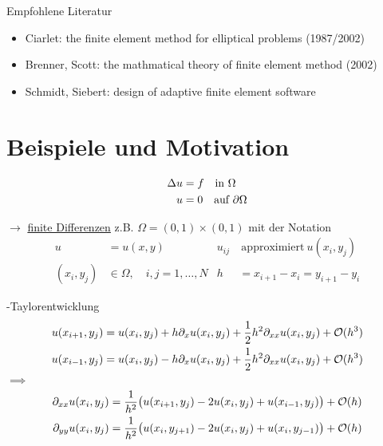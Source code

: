 
Empfohlene Literatur
\begin{itemize}
	\item Ciarlet: the finite element method for elliptical problems (1987/2002)\\
	\item Brenner, Scott: the mathmatical theory of finite element method (2002)\\
	\item Schmidt, Siebert: design of adaptive finite element software
\end{itemize}



\section{Beispiele und Motivation}

\begin{align*}
	\Delta u &= f \quad  \text{in }  \Omega\\
		  	 u &= 0 \quad \text{auf } \partial\Omega
\end{align*}

$\rightarrow$ \underline{finite Differenzen}\enter
\enter
z.B. $\Omega = (0,1) \times (0,1)$ mit der Notation
\begin{align*}
	 u&= u(x,y)				 &   u_{ij}&\ \text{approximiert}\ u(x_i,y_j)\\
	(x_i, y_j) &\in \Omega, \quad i,j = 1,\dots,N&  h&= x_{i+1} - x_i = y_{i+1}-y_i
\end{align*}

-Taylorentwicklung
\begin{align*}
	u(x_{i+1},y_j) &= 	u(x_{i},y_j) + 	h\partial_x u(x_{i},y_j) + \frac{1}{2}h^2 \partial_{xx}	u(x_i,y_j) + \mathcal{O}(h^3)\\
	u(x_{i-1},y_j) &= 	u(x_{i},y_j) - 	h\partial_x u(x_{i},y_j) + \frac{1}{2}h^2 \partial_{xx}	u(x_i,y_j) + \mathcal{O}(h^3)\\
\end{align*}
$\implies$
\begin{align*}
	\partial_{xx} u(x_i,y_j) &= \frac{1}{h^2}\big(	u(x_{i+1},y_j) - 2u(x_i,y_j) + 	u(x_{i-1},y_j) \big) + \mathcal{O}(h)\\
	\partial_{yy} u(x_i,y_j) &= \frac{1}{h^2}\big(	u(x_i,y_{j+1}) - 2u(x_i,y_j) + 	u(x_i,y_{j-1}) \big) + \mathcal{O}(h)
\end{align*}

